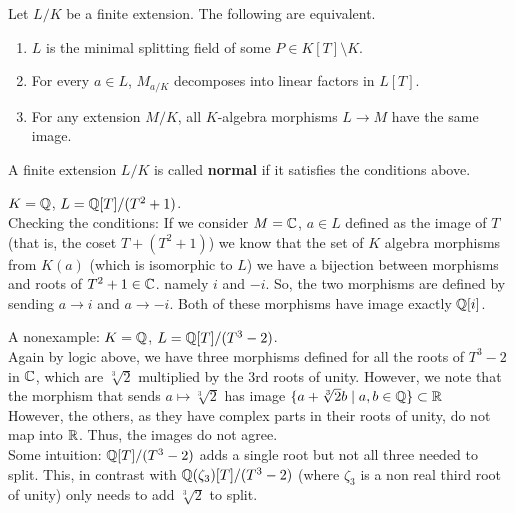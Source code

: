 \begin{prop} \label{Prop 2, Feb 8}
    Let $L / K$ be a finite extension. The following are equivalent.
    \begin{enumerate}
        \item $L$ is the minimal splitting field of some $P \in K[T] \setminus K$.
        \item For every $a \in L$, $M_{a/K}$ decomposes into linear factors in $L[T]$.
        \item For any extension $M/K$, all $K$-algebra morphisms $L \rightarrow M$
        have the same image.
    \end{enumerate}
\end{prop}
\begin{defn} \label{Defn 3, Feb 8}
    A finite extension $L / K$ is called \textbf{normal} if it satisfies the conditions
    above.
\end{defn}
\begin{ex}
    $K = \mathbb{Q}$, $L = \mathbb{Q}[T] / (T^2 + 1)$. \\
    Checking the conditions: If we consider $M = \mathbb{C}$, $a \in L$ defined as the image of $T$
    (that is, the coset $T + (T^2 + 1)$) we know that the set of $K$ algebra morphisms
    from $K(a)$ (which is isomorphic to $L$) we have a bijection between morphisms
    and roots of $T^2 + 1 \in \mathbb{C}$. namely $i$ and $-i$. So, the two
    morphisms are defined by sending $a \rightarrow i$ and $a \rightarrow -i$. Both
    of these morphisms have image exactly $\mathbb{Q}[i]$.
\end{ex}
\begin{ex}
    A nonexample: $K = \mathbb{Q}$, $L = \mathbb{Q}[T] / (T^3 - 2)$. \\
    Again by logic above, we have three morphisms defined for all the
    roots of $T^3 - 2$ in $\mathbb{C}$, which are $\sqrt[3]{2}$ multiplied by the
    3rd roots of unity. However, we note that the morphism that sends
    $a \mapsto \sqrt[3]{2}$ has image $\{a + \sqrt[3]{2}b \mid a, b \in \mathbb{Q}\} \subset \mathbb{R}$ \\
    However, the others, as they have complex parts in their roots of unity, do not
    map into $\mathbb{R}$. Thus, the images do not agree. \\
    Some intuition: $\mathbb{Q}[T] / (T^3 - 2)$ adds a single root but not all three needed
    to split. This, in contrast with $\mathbb{Q}(\zeta_3)[T] / (T^3 - 2)$ (where $\zeta_3$ is a non
    real third root of unity) only needs to add $\sqrt[3]{2}$ to split.
\end{ex}
